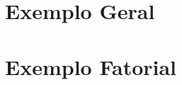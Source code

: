 
\section{Exemplo Geral}
\label{chap:exemplo-geral}
	

\section{Exemplo Fatorial}
\label{chap:exemplo-fatorial}
	
